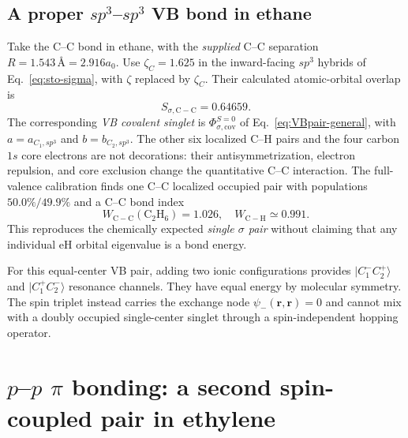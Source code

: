 \documentclass[11pt,letterpaper]{article}
\begin{document}
\subsection{A proper $sp^3$--$sp^3$ VB bond in ethane}
Take the C--C bond in ethane, with the \emph{supplied} C--C separation $R=1.543\,\text{\AA}=2.916a_0$. Use $\zeta_C=1.625$ in the inward-facing $sp^3$ hybrids of Eq.~\eqref{eq:sto-sigma}, with $\zeta$ replaced by $\zeta_C$. Their calculated atomic-orbital overlap is
\begin{equation}\label{eq:ethane-overlap}
\boxed{S_{\sigma,\mathrm{C-C}}=0.64659.}
\end{equation}
The corresponding \emph{VB covalent singlet} is $\Phi_{\sigma,\mathrm{cov}}^{S=0}$ of Eq.~\eqref{eq:VBpair-general}, with $a=a_{C_1,sp^3}$ and $b=b_{C_2,sp^3}$. The other six localized C--H pairs and the four carbon $1s$ core electrons are not decorations: their antisymmetrization, electron repulsion, and core exclusion change the quantitative C--C interaction. The full-valence calibration finds one C--C localized occupied pair with populations $50.0\%/49.9\%$ and a C--C bond index
\begin{equation}\boxed{W_{\mathrm{C-C}}(\mathrm{C_2H_6})=1.026,\quad W_{\mathrm{C-H}}\simeq0.991.}\end{equation}
This reproduces the chemically expected \emph{single $\sigma$ pair} without claiming that any individual eH orbital eigenvalue is a bond energy.

For this equal-center VB pair, adding two ionic configurations provides $|C_1^-C_2^+\rangle$ and $|C_1^+C_2^-\rangle$ resonance channels. They have equal energy by molecular symmetry. The spin triplet instead carries the exchange node $\psi_-(\mathbf r,\mathbf r)=0$ and cannot mix with a doubly occupied single-center singlet through a spin-independent hopping operator.
\FloatBarrier

\section{$p$--$p$ $\pi$ bonding: a second spin-coupled pair in ethylene}
\end{document}
